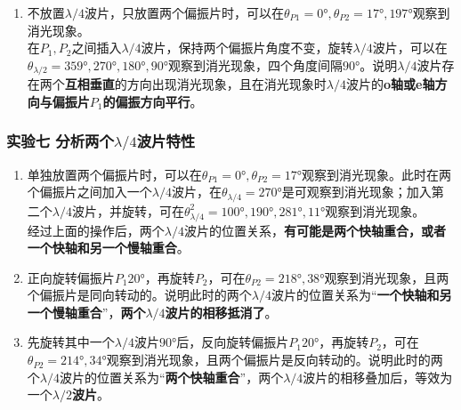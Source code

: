 \documentclass[dvipsnames, svgnames,a4paper,11pt]{article}
\begin{document}
	\begin{enumerate}
		\item 不放置$\lambda/4$波片，只放置两个偏振片时，可以在$\theta_{P1}=\ang{0},\theta_{P2}=\ang{17},\ang{197}$观察到消光现象。	\\
		
		在$P_1,P_2$之间插入$\lambda/4$波片，保持两个偏振片角度不变，旋转$\lambda/4$波片，可以在$\theta_{\lambda/2}=\ang{359},\ang{270},\ang{180},\ang{90}$观察到消光现象，四个角度间隔$\ang{90}$。说明$\lambda/4$波片存在两个\textbf{互相垂直}的方向出现消光现象，且在消光现象时$\lambda/4$波片的\textbf{o轴或e轴方向与偏振片$P_1$的偏振方向平行}。

		
	\end{enumerate}







	\subsubsection{实验七 \quad 分析两个$\lambda/4$波片特性}

	\begin{enumerate}
		\item  单独放置两个偏振片时，可以在$\theta_{P1}=\ang{0},\theta_{P2}=\ang{17}$观察到消光现象。此时在两个偏振片之间加入一个$\lambda/4$波片，在$\theta_{\lambda/4}=\ang{270}$是可观察到消光现象；加入第二个$\lambda/4$波片，并旋转，可在$\theta^2_{\lambda/4}=\ang{100},\ang{190},\ang{281},\ang{11}$观察到消光现象。\\
		
			经过上面的操作后，两个$\lambda/4$波片的位置关系，\textbf{有可能是两个快轴重合，或者一个快轴和另一个慢轴重合}。

		\item 正向旋转偏振片$P_1\ang{20}$，再旋转$P_2$，可在$\theta_{P2}=\ang{218},\ang{38}$观察到消光现象，且两个偏振片是同向转动的。说明此时的两个$\lambda/4$波片的位置关系为“\textbf{一个快轴和另一个慢轴重合}”，\textbf{两个$\lambda/4$波片的相移抵消了}。
		\item 先旋转其中一个$\lambda/4$波片$\ang{90}$后，反向旋转偏振片$P_1\ang{20}$，再旋转$P_2$，可在$\theta_{P2}=\ang{214},\ang{34}$观察到消光现象，且两个偏振片是反向转动的。说明此时的两个$\lambda/4$波片的位置关系为“\textbf{两个快轴重合}”，两个$\lambda/4$波片的相移叠加后，等效为一个\textbf{$\lambda/2$波片}。
	\end{enumerate}
\end{document}
